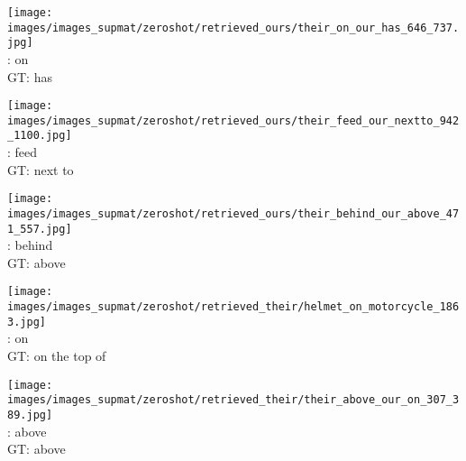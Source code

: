 \documentclass[10pt,twocolumn,letterpaper]{article}
\begin{document}
\begin{figure*}[t]
\begin{minipage}[t]{0.185\textwidth}
    	\centering
       	\texttt{[image: images/images\_supmat/zeroshot/retrieved\_ours/their\_on\_our\_has\_646\_737.jpg]}\\
       	\vspace{0.3ex}
       	\cite{Lu16}: on \\
       	GT: has
       	\vspace{2ex}
    \end{minipage}
    \hspace{0.005\textwidth}
\begin{minipage}[t]{0.185\textwidth}
       \centering
       \texttt{[image: images/images\_supmat/zeroshot/retrieved\_ours/their\_feed\_our\_nextto\_942\_1100.jpg]}\\
       \vspace{0.3ex}
       \cite{Lu16}: feed \\
       GT: next to
       \vspace{0.2ex}
    \end{minipage}
    \hspace{0.005\textwidth}
\begin{minipage}[t]{0.185\textwidth}
       \centering
       \texttt{[image: images/images\_supmat/zeroshot/retrieved\_ours/their\_behind\_our\_above\_471\_557.jpg]}\\
       \vspace{0.3ex}
       \cite{Lu16}: behind \\
       GT: above
       \vspace{0.2ex}
    \end{minipage}
    \hspace{0.005\textwidth}
\begin{minipage}[t]{0.185\textwidth}
    	\centering
       	\texttt{[image: images/images\_supmat/zeroshot/retrieved\_their/helmet\_on\_motorcycle\_1863.jpg]}\\
       	\vspace{0.3ex}
       	\cite{Lu16}: on \\
       	GT: on the top of
       	\vspace{0.2ex}
    \end{minipage}
    \hspace{0.005\textwidth} 
\begin{minipage}[t]{0.185\textwidth}
    	\centering
       	\texttt{[image: images/images\_supmat/zeroshot/retrieved\_their/their\_above\_our\_on\_307\_389.jpg]}\\
       	\vspace{0.3ex}
       	\cite{Lu16}: above \\
       	GT: above
      	\vspace{0.2ex}
    \end{minipage}  


\end{figure*}
\end{document}
